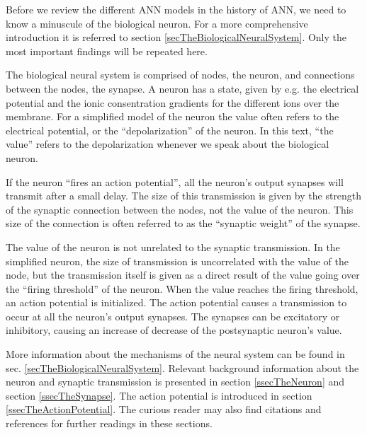 Before we review the different ANN models in the history of ANN, we need to know a minuscule of the biological neuron. 
For a more comprehensive introduction it is referred to section \ref{secTheBiologicalNeuralSystem}.
Only the most important findings will be repeated here.

The biological neural system is comprised of nodes, the neuron, and connections between the nodes, the synapse.
A neuron has a state, given by e.g. the electrical potential and the ionic consentration gradients for the different ions over the membrane.
For a simplified model of the neuron the value often refers to the electrical potential, or the ``depolarization'' of the neuron. %
In this text, ``the value'' refers to the depolarization whenever we speak about the biological neuron.

If the neuron ``fires an action potential'', all the neuron's output synapses will transmit after a small delay.
The size of this transmission is given by the strength of the synaptic connection between the nodes, not the value of the neuron.
This size of the connection is often referred to as the ``synaptic weight'' of the synapse.

The value of the neuron is not unrelated to the synaptic transmission.
In the simplified neuron, the size of transmission is uncorrelated with the value of the node, but the transmission itself is given as a direct result of the value going over the ``firing threshold'' of the neuron.
When the value reaches the firing threshold, an action potential is initialized.
The action potential causes a transmission to occur at all the neuron's output synapses.
The synapses can be excitatory or inhibitory, causing an increase of decrease of the postsynaptic neuron's value. %

More information about the mechanisms of the neural system can be found in sec. \ref{secTheBiologicalNeuralSystem}. 
Relevant background information about the neuron and synaptic transmission is presented in section \ref{ssecTheNeuron} and section \ref{ssecTheSynapse}. 
The action potential is introduced in section \ref{ssecTheActionPotential}.
The curious reader may also find citations and references for further readings in these sections.

